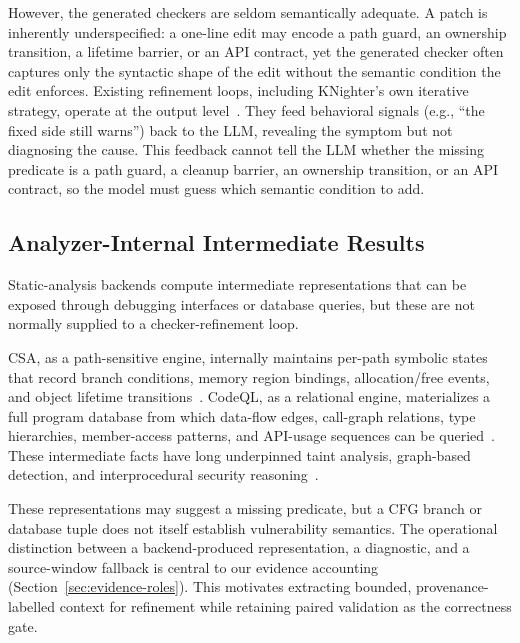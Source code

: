 However, the generated checkers are seldom semantically adequate.
A patch is inherently underspecified: a one-line edit may encode a path guard, an ownership transition, a lifetime barrier, or an API contract, yet the generated checker often captures only the syntactic shape of the edit without the semantic condition the edit enforces.
Existing refinement loops, including KNighter's own iterative strategy, operate at the output level~\cite{yang2025knighter,madaan2023selfrefine,shinn2023reflexion}.
They feed behavioral signals (e.g., ``the fixed side still warns'') back to the LLM, revealing the symptom but not diagnosing the cause.
This feedback cannot tell the LLM whether the missing predicate is a path guard, a cleanup barrier, an ownership transition, or an API contract, so the model must guess which semantic condition to add.

\subsection{Analyzer-Internal Intermediate Results}

Static-analysis backends compute intermediate representations that can be exposed through debugging interfaces or database queries, but these are not normally supplied to a checker-refinement loop.

CSA, as a path-sensitive engine, internally maintains per-path symbolic states that record branch conditions, memory region bindings, allocation/free events, and object lifetime transitions~\cite{clangsaDocs}.
CodeQL, as a relational engine, materializes a full program database from which data-flow edges, call-graph relations, type hierarchies, member-access patterns, and API-usage sequences can be queried~\cite{avgustinov2016ql,codeqlDocs}.
These intermediate facts have long underpinned taint analysis, graph-based detection, and interprocedural security reasoning~\cite{livshits2005finding,jovanovic2006pixy,arzt2014flowdroid,yamaguchi2014cpg}.

These representations may suggest a missing predicate, but a CFG branch or database tuple does not itself establish vulnerability semantics.
The operational distinction between a backend-produced representation, a diagnostic, and a source-window fallback is central to our evidence accounting (Section~\ref{sec:evidence-roles}).
This motivates extracting bounded, provenance-labelled context for refinement while retaining paired validation as the correctness gate.
